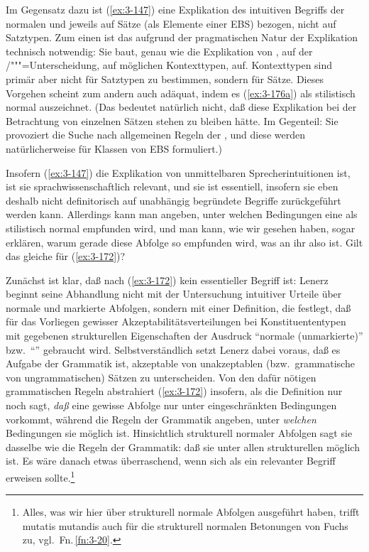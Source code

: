 \documentclass[output=paper]{langsci/langscibook}
\begin{document}
Im Gegensatz dazu ist (\ref{ex:3-147}) eine Explikation des intuitiven Begriffs
der normalen  und jeweils auf Sätze (als Elemente einer
EBS) bezogen, nicht auf Satztypen. Zum einen ist das aufgrund der
pragmatischen Natur der Explikation technisch notwendig: Sie baut,
genau wie die Explikation von ,
auf der /"""=Unterscheidung, \dash auf möglichen Kontexttypen,
auf. Kontexttypen sind primär aber nicht für Satztypen zu bestimmen,
sondern für Sätze. Dieses Vorgehen scheint zum andern auch adäquat,
indem es \zb (\ref{ex:3-176a}) als stilistisch normal auszeichnet. (Das
bedeutet natürlich nicht, daß diese Explikation bei der Betrachtung
von einzelnen Sätzen stehen zu bleiben hätte. Im Gegenteil: Sie
provoziert die Suche nach allgemeinen Regeln der , und
diese werden natürlicherweise für Klassen von EBS formuliert.)

Insofern (\ref{ex:3-147}) die Explikation von unmittelbaren Sprecherintuitionen
ist, ist sie sprachwissenschaftlich relevant, und sie ist essentiell,
insofern sie eben deshalb nicht definitorisch auf unabhängig
begründete Begriffe zurückgeführt werden kann. Allerdings kann man
angeben, unter welchen Bedingungen eine  als stilistisch
normal empfunden wird, und man kann, wie wir gesehen haben, sogar
erklären, warum gerade diese Abfolge so empfunden wird, was an ihr
also  ist. Gilt das gleiche für (\ref{ex:3-172})?

Zunächst ist klar, daß  nach (\ref{ex:3-172})
kein essentieller Begriff ist: Lenerz beginnt seine Abhandlung nicht mit der Untersuchung intuitiver Urteile über normale und markierte Abfolgen, sondern mit einer Definition, die festlegt, daß für das
Vorliegen gewisser Akzeptabilitätsverteilungen bei Konstituententypen mit gegebenen strukturellen Eigenschaften der Ausdruck "`normale (unmarkierte)"' bzw.\ "`"' gebraucht
wird. Selbstverständlich setzt Lenerz dabei voraus, daß es Aufgabe der
Grammatik ist, akzeptable von unakzeptablen (bzw.\ grammatische von
ungrammatischen) Sätzen zu unterscheiden. Von den dafür nötigen
grammatischen Regeln abstrahiert (\ref{ex:3-172}) insofern, als die Definition
nur noch sagt, \textit{daß} eine gewisse Abfolge nur unter eingeschränkten
Bedingungen vorkommt, während die Regeln der Grammatik angeben, unter
\textit{welchen} Bedingungen sie möglich ist. Hinsichtlich strukturell normaler
Abfolgen sagt sie dasselbe wie die Regeln der Grammatik: daß sie unter
allen strukturellen  möglich ist. Es wäre danach
etwas überraschend, wenn  sich als
ein relevanter Begriff erweisen sollte.\footnote{\label{fn:3-33}%
	Alles, was wir hier über strukturell
  normale Abfolgen ausgeführt haben, trifft mutatis mutandis auch für die strukturell normalen
  Betonungen von Fuchs zu, vgl.\ Fn.\,\ref{fn:3-20}.%
} 
\end{document}
